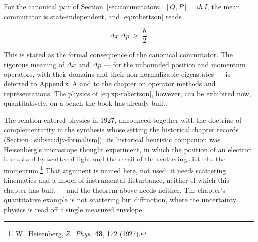For the canonical pair of Section~\ref{sec:commutators}, $[Q,P] = i\hbar\,I$, the mean commutator is state-independent, and \eqref{eq:robertson} reads
\begin{linenomath}
    \begin{equation}
        \Delta x\,\Delta p \;\geq\; \frac{\hbar}{2} .
        \label{eq:xp-robertson}
    \end{equation}
\end{linenomath}
This is stated as the formal consequence of the canonical commutator. The rigorous meaning of $\Delta x$ and $\Delta p$ --- for the unbounded position and momentum operators, with their domains and their non-normalizable eigenstates --- is deferred to Appendix~A and to the chapter on operator methods and representations. The physics of \eqref{eq:xp-robertson}, however, can be exhibited now, quantitatively, on a bench the book has already built.

The relation entered physics in 1927, announced together with the doctrine of complementarity in the synthesis whose setting the historical chapter records (Section~\ref{subsec:djv-formalism}); its historical heuristic companion was Heisenberg's microscope thought experiment, in which the position of an electron is resolved by scattered light and the recoil of the scattering disturbs the momentum.\footnote{W.~Heisenberg, \emph{Z.~Phys.} \textbf{43}, 172 (1927).} That argument is named here, not used: it needs scattering kinematics and a model of instrumental disturbance, neither of which this chapter has built --- and the theorem above needs neither. The chapter's quantitative example is not scattering but diffraction, where the uncertainty physics is read off a single measured envelope.

